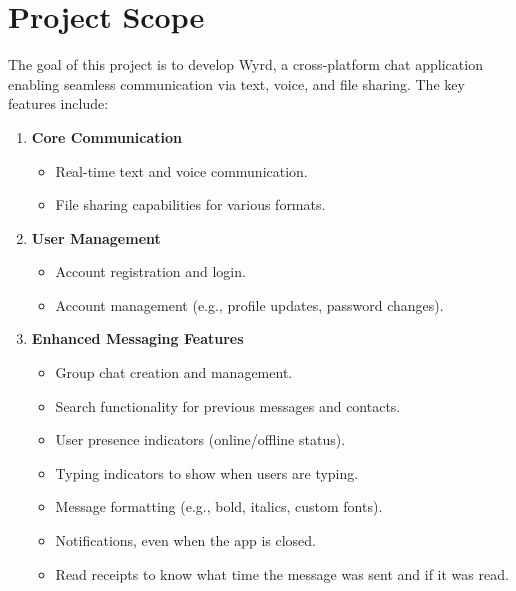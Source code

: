 \documentclass{scrreprt}
\begin{document}
\section{Project Scope}
The goal of this project is to develop Wyrd, a cross-platform chat application enabling seamless communication via text, voice, and file sharing. 
The key features include: 
    \begin{enumerate}
        \item \textbf{Core Communication}
            \begin{itemize}
                \item Real-time text and voice communication.
                \item File sharing capabilities for various formats.
            \end{itemize} 

        \item \textbf{User Management}
        \begin{itemize}
            \item Account registration and login.
            \item Account management (e.g., profile updates, password changes).
        \end{itemize}

        \item \textbf{Enhanced Messaging Features}
        \begin{itemize}
       \item     Group chat creation and management.
       \item     Search functionality for previous messages and contacts.
       \item     User presence indicators (online/offline status).
       \item     Typing indicators to show when users are typing.
       \item     Message formatting (e.g., bold, italics, custom fonts).
       \item     Notifications, even when the app is closed.
       \item     Read receipts to know what time the message was sent and if it was read.
        \end{itemize}
    \end{enumerate}
\end{document}
